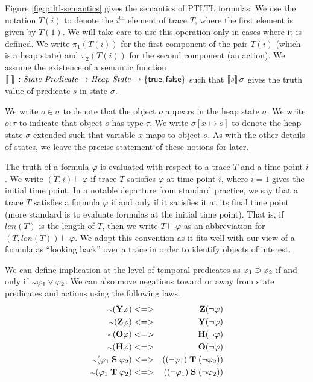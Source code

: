 \documentclass{article}
\newcommand{\ltlform}{\varphi}
\newcommand{\len}{\mathit{len}}
\newcommand{\ltlY}{\mathbf{Y}}
\newcommand{\ltlZ}{\mathbf{Z}}
\newcommand{\ltlO}{\mathbf{O}}
\newcommand{\ltlH}{\mathbf{H}}
\newcommand{\ltlS}{\mathrel{\mathbf{S}}}
\newcommand{\ltlT}{\mathrel{\mathbf{T}}}
\newcommand{\ltlneg}{\mathord{\hbox{\scriptsize$\sim$}}}
\newcommand{\ltlimp}{\mathbin{\vcenter{\offinterlineskip\vskip 0.1em\hbox{\hskip 0.2em$\cdot$}\vskip-0.55em\hbox{$\supset$}}}}
\begin{document}
Figure \ref{fig:ptltl-semantics} gives the semantics of PTLTL formulas.  We use the notation $T(i)$ to denote the $i^{\text{th}}$ element of trace $T$, where the first element is given by $T(1)$.  We will take care to use this operation only in cases where it is defined.  We write $\pi_1(T(i))$ for the first component of the pair $T(i)$ (which is a heap state) and $\pi_2(T(i))$ for the second component (an action).  We assume the existence of a semantic function $\llbracket\cdot\rrbracket\, : \textit{State Predicate} \rightarrow \textit{Heap State} \rightarrow \{\mathsf{true},\mathsf{false}\}$ such that $\llbracket s\rrbracket\, \sigma$ gives the truth value of predicate $s$ in state $\sigma$.

We write $o \in \sigma$ to denote that the object $o$ appears in the heap state $\sigma$.  We write $o : \tau$ to indicate that object $o$ has type $\tau$.  We write $\sigma[x \mapsto o]$ to denote the heap state $\sigma$ extended such that variable $x$ maps to object $o$.  As with the other details of states, we leave the precise statement of these notions for later.

The truth of a formula $\ltlform$ is evaluated with respect to a trace $T$ and a time point $i$.  We write $(T,i) \models \ltlform$ if trace $T$ satisfies $\ltlform$ at time point $i$, where $i=1$ gives the initial time point.  In a notable departure from standard practice, we say that a trace $T$ satisfies a formula $\ltlform$ if and only if it satisfies it at its final time point (more standard is to evaluate formulas at the initial time point).  That is, if $\len(T)$ is the length of $T$, then we write $T \models \ltlform$ as an abbreviation for $(T,\len(T)) \models \ltlform$.  We adopt this convention as it fits well with our view of a formula as ``looking back'' over a trace in order to identify objects of interest.

We can define implication at the level of temporal predicates as $\ltlform_1 \ltlimp \ltlform_2$ if and only if $\ltlneg\ltlform_1 \vee \ltlform_2$.  We can also move negations toward or away from state predicates and actions using the following laws.
\begin{eqnarray*}
\ltlneg(\ltlY \ltlform) &<=>& \ltlZ (\neg\ltlform)\\
\ltlneg(\ltlZ \ltlform) &<=>& \ltlY (\neg\ltlform)\\
\ltlneg(\ltlO \ltlform) &<=>& \ltlH (\neg\ltlform)\\
\ltlneg(\ltlH \ltlform) &<=>& \ltlO (\neg\ltlform)\\
\ltlneg(\ltlform_1 \ltlS \ltlform_2) &<=>& ((\neg\ltlform_1) \ltlT (\neg\ltlform_2))\\
\ltlneg(\ltlform_1 \ltlT \ltlform_2) &<=>& ((\neg\ltlform_1) \ltlS (\neg\ltlform_2))
\end{eqnarray*}
\end{document}
